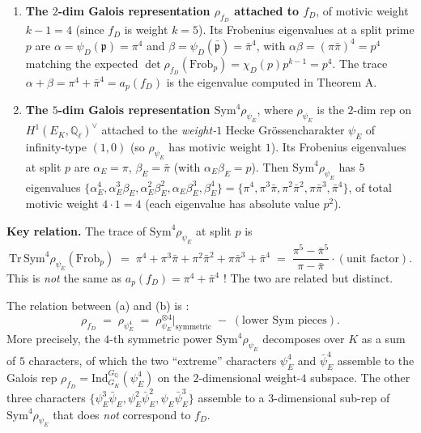 \documentclass[
  11pt,
  a4paper,
]{amsart}
\begin{document}
\begin{enumerate}
\def\labelenumi{(\alph{enumi})}
\item
  \textbf{The \(2\)-dim Galois representation \(\rho_{f_D}\) attached to \(f_D\)}, of motivic weight \(k - 1 = 4\) (since \(f_D\) is weight \(k = 5\)). Its Frobenius eigenvalues at a split prime \(p\) are \(\alpha = \psi_D(\mathfrak{p}) = \pi^4\) and \(\beta = \psi_D(\bar{\mathfrak{p}}) = \bar\pi^4\), with \(\alpha\beta = (\pi\bar\pi)^4 = p^4\) matching the expected \(\det \rho_{f_D}(\mathrm{Frob}_p) = \chi_D(p) p^{k - 1} = p^4\). The trace \(\alpha + \beta = \pi^4 + \bar\pi^4 = a_p(f_D)\) is the eigenvalue computed in Theorem A.
\item
  \textbf{The \(5\)-dim Galois representation \(\mathrm{Sym}^4 \rho_{\psi_E}\)}, where \(\rho_{\psi_E}\) is the \(2\)-dim rep on \(H^1(E_K, \mathbb{Q}_\ell)^\vee\) attached to the \emph{weight-\(1\)} Hecke Grössencharakter \(\psi_E\) of infinity-type \((1, 0)\) (so \(\rho_{\psi_E}\) has motivic weight \(1\)). Its Frobenius eigenvalues at split \(p\) are \(\alpha_E = \pi\), \(\beta_E = \bar\pi\) (with \(\alpha_E\beta_E = p\)). Then \(\mathrm{Sym}^4 \rho_{\psi_E}\) has \(5\) eigenvalues \(\{\alpha_E^4, \alpha_E^3\beta_E, \alpha_E^2\beta_E^2, \alpha_E\beta_E^3, \beta_E^4\} = \{\pi^4, \pi^3\bar\pi, \pi^2\bar\pi^2, \pi\bar\pi^3, \bar\pi^4\}\), of total motivic weight \(4 \cdot 1 = 4\) (each eigenvalue has absolute value \(p^2\)).
\end{enumerate}

\textbf{Key relation.} The trace of \(\mathrm{Sym}^4 \rho_{\psi_E}\) at split \(p\) is
\[
\mathrm{Tr}\,\mathrm{Sym}^4 \rho_{\psi_E}(\mathrm{Frob}_p) \;=\; \pi^4 + \pi^3\bar\pi + \pi^2\bar\pi^2 + \pi\bar\pi^3 + \bar\pi^4 \;=\; \frac{\pi^5 - \bar\pi^5}{\pi - \bar\pi} \cdot (\text{unit factor}).
\]
This is \emph{not} the same as \(a_p(f_D) = \pi^4 + \bar\pi^4\) ! The two are related but distinct.

The relation between (a) and (b) is :
\[
\rho_{f_D} \;=\; \rho_{\psi_E^4} \;=\; \rho_{\psi_E}^{\otimes 4}\bigr|_{\text{symmetric}} \;-\; (\text{lower Sym pieces}).
\]
More precisely, the \(4\)-th symmetric power \(\mathrm{Sym}^4 \rho_{\psi_E}\) decomposes over \(K\) as a sum of \(5\) characters, of which the two ``extreme'' characters \(\psi_E^4\) and \(\bar\psi_E^4\) assemble to the Galois rep \(\rho_{f_D} = \mathrm{Ind}_{G_K}^{G_\mathbb{Q}}(\psi_E^4)\) on the \(2\)-dimensional weight-\(4\) subspace. The other three characters \(\{\psi_E^3 \bar\psi_E, \psi_E^2 \bar\psi_E^2, \psi_E \bar\psi_E^3\}\) assemble to a \(3\)-dimensional sub-rep of \(\mathrm{Sym}^4 \rho_{\psi_E}\) that does \emph{not} correspond to \(f_D\).
\end{document}

